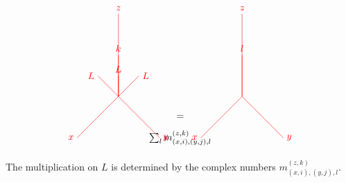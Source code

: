 \documentclass{article}
\begin{document}
\[
\begin{tikzpicture}[scale=1.5]
    \draw[red] (0,0) -- (0,2) node[above] {$z$};
    \draw[red] (0,0) -- (-1,-1) node[left] {$x$};
    \draw[red] (0,0) -- (1,-1) node[right] {$y$};
    \draw[red] (0,0) -- (0,1) node[above] {$k$};
    \draw[red] (0,0) -- (0,0.5) node[above] {$L$};
    \draw[red] (0,0) -- (-0.5,0.5) node[left] {$L$};
    \draw[red] (0,0) -- (0.5,0.5) node[right] {$L$};
    
    \draw[red] (3,0) -- (3,2) node[above] {$z$};
    \draw[red] (3,0) -- (2,-1) node[left] {$x$};
    \draw[red] (3,0) -- (4,-1) node[right] {$y$};
    \draw[red] (3,0) -- (3,1) node[above] {$l$};
    
    \node at (1.5, -0.5) {$=$};
    \node at (1.5, -1) {$\sum_l m_{(x,i),(y,j),l}^{(z,k)}$};
\end{tikzpicture}
\]

The multiplication on \( L \) is determined by the complex numbers \( m_{(x,i),(y,j),l}^{(z,k)} \).
\end{document}
